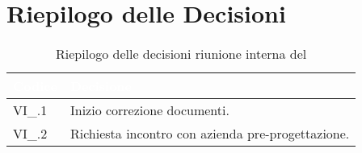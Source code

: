 \section{Riepilogo delle Decisioni}


\begin{table}[!htbp]
\renewcommand{\arraystretch}{1.5}
\begin{tabular}{m{}<{\centering}  m{}<{\centering}}
\rowcolor{darkblue} \textcolor{white}{\textbf{Codice}} & \textcolor{white}{\textbf{Decisione}} \\
\hline
VI\_{}\D{}.1 & Inizio correzione documenti.\\
VI\_{}\D{}.2 & Richiesta incontro con azienda pre-progettazione.\\
\end{tabular}
\caption{Riepilogo delle decisioni riunione interna del \D}
\end{table}